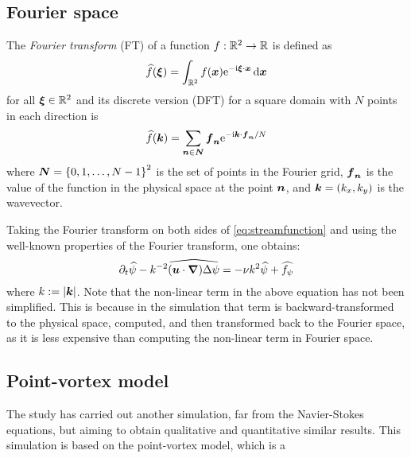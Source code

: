\documentclass[../main.tex]{subfiles}
\begin{document}
\subsection{Fourier space}
The \emph{Fourier transform} (FT) of a function $f:\mathbb{R}^2 \to \mathbb{R}$ is defined as
\begin{equation}
	\widehat{f}(\boldsymbol{\xi}) = \int_{\mathbb{R}^2} f(\boldsymbol{x}) \mathrm{e}^{-\mathrm{i} \boldsymbol{\xi} \cdot \boldsymbol{x}} \dd{\boldsymbol{x}}
\end{equation}
for all $\boldsymbol{\xi}\in\mathbb{R}^2$ and its discrete version (DFT) for a square domain with $N$ points in each direction is
\begin{equation}
	\widehat{f}(\boldsymbol{k}) = \sum_{\boldsymbol{n}\in\boldsymbol{N}} \boldsymbol{f}_{\boldsymbol{n}} \mathrm{e}^{-\mathrm{i} \boldsymbol{k} \cdot \boldsymbol{f}_{\boldsymbol{n}}/N}
\end{equation}
where $\boldsymbol{N} = {\{0,1,\ldots,N-1\}}^2$ is the set of points in the Fourier grid, $\boldsymbol{f}_{\boldsymbol{n}}$ is the value of the function in the physical space at the point $\boldsymbol{n}$, and $\boldsymbol{k} = (k_x,k_y)$ is the wavevector.

Taking the Fourier transform on both sides of \cref{eq:streamfunction} and using the well-known properties of the Fourier transform, one obtains:
\begin{equation}\label{eq:streamfunction_fourier}
	\partial_t \widehat{\psi} - k^{-2} \widehat{(\boldsymbol{u}\cdot \grad) \Delta \psi}= -\nu k^2 \widehat{\psi} + \widehat{f_\psi}
\end{equation}
where $k:=\abs{\boldsymbol{k}}$. Note that the non-linear term in the above equation has not been simplified. This is because in the simulation that term is backward-transformed to the physical space, computed, and then transformed back to the Fourier space, as it is less expensive than computing the non-linear term in Fourier space.

\subsection{Point-vortex model}
The study has carried out another simulation, far from the Navier-Stokes equations, but aiming to obtain qualitative and quantitative similar results. This simulation is based on the point-vortex model, which is a
\end{document}
